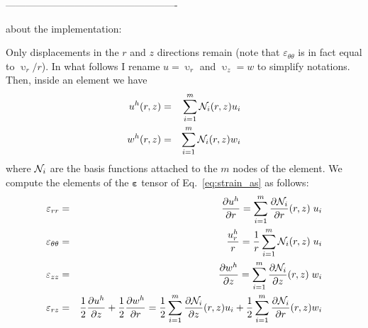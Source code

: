 ----------------------------------------------------

{\color{purple} about the implementation:}

Only displacements in the $r$ and $z$ directions remain (note that $\varepsilon_{\theta\theta}$ is in fact equal to $\upupsilon_r/r$). In what follows I rename $u=\upupsilon_r$ and $\upupsilon_z=w$ to simplify notations. 
Then, inside an element we have 
\begin{eqnarray}
u^h(r,z) &=& \sum_{i=1}^m {\mathcal{N}}_i(r,z) u_i \nonumber\\
w^h(r,z) &=& \sum_{i=1}^m {\mathcal{N}}_i(r,z) w_i
\end{eqnarray}
where ${\mathcal{N}}_i$ are the basis functions attached 
to the $m$ nodes of the element.
We compute the elements of the ${\bm \varepsilon}$ tensor of Eq.~\eqref{eq:strain_as} as follows:
\begin{eqnarray}
\varepsilon_{rr} &=&
\frac{\partial u^h}{\partial r} 
= \sum_{i=1}^m \frac{\partial {\mathcal{N}}_i}{\partial r}(r,z) \; u_i \\
\varepsilon_{\theta\theta} &=& \frac{u_r^h}{r} = 
\frac{1}{r}\sum_{i=1}^m {\mathcal{N}}_i(r,z) \;  u_i \\
\varepsilon_{zz} &=& 
\frac{\partial w^h}{\partial z}
= \sum_{i=1}^m \frac{\partial {\mathcal{N}}_i}{\partial z}(r,z) \; w_i \\
\varepsilon_{rz} &=& \frac12\frac{\partial u^h}{\partial z}
+\frac12 \frac{\partial w^h}{\partial r}
= \frac12\sum_{i=1}^m \frac{\partial {\mathcal{N}}_i}{\partial z}(r,z) u_i 
+ \frac12\sum_{i=1}^m \frac{\partial {\mathcal{N}}_i}{\partial r}(r,z) w_i 
\end{eqnarray}

